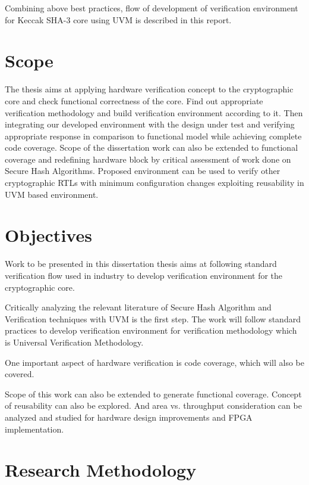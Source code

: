 Combining above best practices, flow of development of verification environment for Keccak SHA-3 core using UVM is described in this report.

\section{Scope}

The thesis aims at applying hardware verification concept to the cryptographic core and check functional correctness of the core. Find out appropriate verification methodology and build verification environment according to it. Then integrating our developed environment with the design under test and verifying appropriate response in comparison to functional model while achieving complete code coverage. Scope of the dissertation work can also be extended to functional coverage and redefining hardware block by critical assessment of work done on Secure Hash Algorithms. Proposed environment can be used to verify other cryptographic RTLs with minimum configuration changes exploiting reusability in UVM based environment.

\section{Objectives}

Work to be presented in this dissertation thesis aims at following standard verification flow used in industry to develop verification environment for the cryptographic core. \par

Critically analyzing the relevant literature of Secure Hash Algorithm and Verification techniques with UVM is the first step. The work will follow standard practices to develop verification environment for verification methodology which is Universal Verification Methodology. \par

One important aspect of hardware verification is code coverage, which will also be covered. \par

Scope of this work can also be extended to generate functional coverage. Concept of reusability can also be explored. And area vs. throughput consideration can be analyzed and studied for hardware design improvements and FPGA implementation. \par

\section{Research Methodology}

